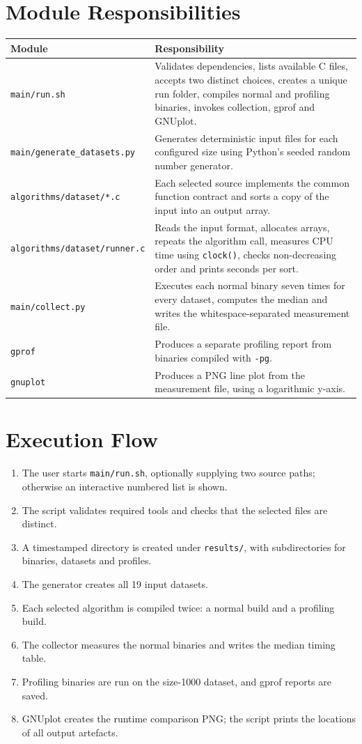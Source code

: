 \documentclass[12pt,a4paper,oneside]{report}
\begin{document}
\section{Module Responsibilities}
\begin{longtable}{p{}p{}}
\toprule\textbf{Module} & \textbf{Responsibility}\\\midrule
\texttt{main/run.sh} & Validates dependencies, lists available C files, accepts two distinct choices, creates a unique run folder, compiles normal and profiling binaries, invokes collection, gprof and GNUplot.\\
\texttt{main/generate\_datasets.py} & Generates deterministic input files for each configured size using Python's seeded random number generator.\\
\texttt{algorithms/dataset/*.c} & Each selected source implements the common function contract and sorts a copy of the input into an output array.\\
\texttt{algorithms/dataset/runner.c} & Reads the input format, allocates arrays, repeats the algorithm call, measures CPU time using \texttt{clock()}, checks non-decreasing order and prints seconds per sort.\\
\texttt{main/collect.py} & Executes each normal binary seven times for every dataset, computes the median and writes the whitespace-separated measurement file.\\
\texttt{gprof} & Produces a separate profiling report from binaries compiled with \texttt{-pg}.\\
\texttt{gnuplot} & Produces a PNG line plot from the measurement file, using a logarithmic y-axis.\\
\bottomrule\end{longtable}
\section{Execution Flow}
\begin{enumerate}[leftmargin=*]
\item The user starts \texttt{main/run.sh}, optionally supplying two source paths; otherwise an interactive numbered list is shown.
\item The script validates required tools and checks that the selected files are distinct.
\item A timestamped directory is created under \texttt{results/}, with subdirectories for binaries, datasets and profiles.
\item The generator creates all 19 input datasets.
\item Each selected algorithm is compiled twice: a normal build and a profiling build.
\item The collector measures the normal binaries and writes the median timing table.
\item Profiling binaries are run on the size-1000 dataset, and gprof reports are saved.
\item GNUplot creates the runtime comparison PNG; the script prints the locations of all output artefacts.
\end{enumerate}
\end{document}
